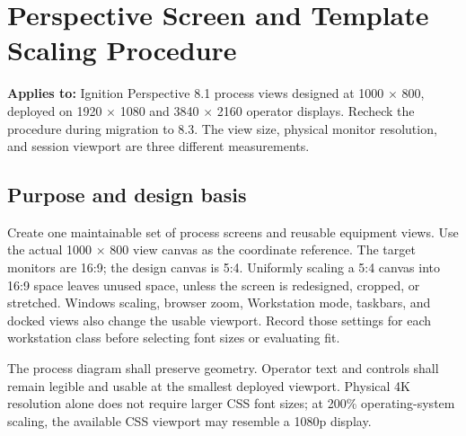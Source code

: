 \chapter{Perspective Screen and Template Scaling Procedure}
\label{app:perspective-scaling}
\setlength{\emergencystretch}{3em}

\textbf{Applies to:} Ignition Perspective 8.1 process views designed at 1000 $\times$ 800, deployed on 1920 $\times$ 1080 and 3840 $\times$ 2160 operator displays. Recheck the procedure during migration to 8.3. The view size, physical monitor resolution, and session viewport are three different measurements.

\section{Purpose and design basis}
Create one maintainable set of process screens and reusable equipment views. Use the actual 1000 $\times$ 800 view canvas as the coordinate reference. The target monitors are 16:9; the design canvas is 5:4. Uniformly scaling a 5:4 canvas into 16:9 space leaves unused space, unless the screen is redesigned, cropped, or stretched. Windows scaling, browser zoom, Workstation mode, taskbars, and docked views also change the usable viewport. Record those settings for each workstation class before selecting font sizes or evaluating fit.

The process diagram shall preserve geometry. Operator text and controls shall remain legible and usable at the smallest deployed viewport. Physical 4K resolution alone does not require larger CSS font sizes; at 200\% operating-system scaling, the available CSS viewport may resemble a 1080p display.

